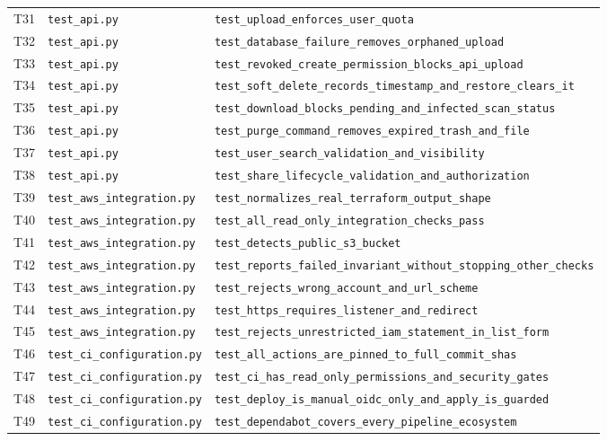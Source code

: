 {\begin{longtable}{P{.8cm}P{4cm}P{8cm}}
T31 & \nolinkurl{test_api.py} & \nolinkurl{test_upload_enforces_user_quota} \\
T32 & \nolinkurl{test_api.py} & \nolinkurl{test_database_failure_removes_orphaned_upload} \\
T33 & \nolinkurl{test_api.py} & \nolinkurl{test_revoked_create_permission_blocks_api_upload} \\
T34 & \nolinkurl{test_api.py} & \nolinkurl{test_soft_delete_records_timestamp_and_restore_clears_it} \\
T35 & \nolinkurl{test_api.py} & \nolinkurl{test_download_blocks_pending_and_infected_scan_status} \\
T36 & \nolinkurl{test_api.py} & \nolinkurl{test_purge_command_removes_expired_trash_and_file} \\
T37 & \nolinkurl{test_api.py} & \nolinkurl{test_user_search_validation_and_visibility} \\
T38 & \nolinkurl{test_api.py} & \nolinkurl{test_share_lifecycle_validation_and_authorization} \\
T39 & \nolinkurl{test_aws_integration.py} & \nolinkurl{test_normalizes_real_terraform_output_shape} \\
T40 & \nolinkurl{test_aws_integration.py} & \nolinkurl{test_all_read_only_integration_checks_pass} \\
T41 & \nolinkurl{test_aws_integration.py} & \nolinkurl{test_detects_public_s3_bucket} \\
T42 & \nolinkurl{test_aws_integration.py} & \nolinkurl{test_reports_failed_invariant_without_stopping_other_checks} \\
T43 & \nolinkurl{test_aws_integration.py} & \nolinkurl{test_rejects_wrong_account_and_url_scheme} \\
T44 & \nolinkurl{test_aws_integration.py} & \nolinkurl{test_https_requires_listener_and_redirect} \\
T45 & \nolinkurl{test_aws_integration.py} & \nolinkurl{test_rejects_unrestricted_iam_statement_in_list_form} \\
T46 & \nolinkurl{test_ci_configuration.py} & \nolinkurl{test_all_actions_are_pinned_to_full_commit_shas} \\
T47 & \nolinkurl{test_ci_configuration.py} & \nolinkurl{test_ci_has_read_only_permissions_and_security_gates} \\
T48 & \nolinkurl{test_ci_configuration.py} & \nolinkurl{test_deploy_is_manual_oidc_only_and_apply_is_guarded} \\
T49 & \nolinkurl{test_ci_configuration.py} & \nolinkurl{test_dependabot_covers_every_pipeline_ecosystem} \\

\end{longtable}}
